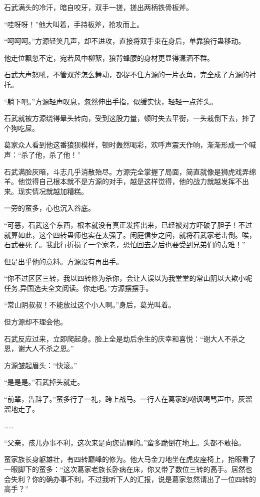 \begin{this_body}
石武满头的冷汗，暗自咬牙，双手一搓，搓出两柄铁骨板斧。

“哇呀呀！”他大叫着，手持板斧，抢攻而上。

“呵呵呵。”方源轻笑几声，却不进攻，直接将双手束在身后，单靠狼行蛊移动。

他走位飘忽不定，宛若风中柳絮，狼背蜂腰的身材更显得潇洒不群。

石武大声怒吼，不管双斧怎么舞动，都捉不住方源的一片衣角，完全成了方源的衬托。

“躺下吧。”方源轻声叹息，忽然伸出手指，似缓实快，轻轻一点斧头。

石武就被方源绕得晕头转向，受到这股力量，顿时失去平衡，一头栽倒下去，摔了个狗吃屎。

葛家众人看到他这番狼狈模样，顿时轰然喝彩，欢呼声震天作响，渐渐形成一个喊声：“杀了他，杀了他！”

石武满脸灰暗，斗志几乎消散殆尽。方源完全掌握了局面，简直就像是狮虎戏弄绵羊。他觉得自己根本就不是方源的对手，越是这样觉得，他的战力就越发挥不出来。现实情况就越加糟糕。

一旁的蛮多，心也沉入谷底。

“可恶，石武这个东西，根本就没有真正发挥出来，已经被对方吓破了胆子！不过就算如此，这个四转蛊师也实在太强了。闲庭信步之间，就将石武家老击倒。唉，石武要死了。我此行折损了一个家老，恐怕回去之后也要受到兄弟们的责难！”

但是出乎他的意料。方源没有再出手。

“你不过区区三转，我以四转修为杀你，会让人误以为我堂堂的常山阴以大欺小呢任务,异国选夫全文阅读。你走吧。”方源摆摆手。

“常山阴叔叔！不能放过这个小人啊。”身后，葛光叫着。

但方源却不理会他。

石武反应过来，立即爬起身。脸上全是劫后余生的庆幸和喜悦：“谢大人不杀之恩，谢大人不杀之恩。”

方源皱起眉头：“快滚。”

“是是是。”石武掉头就走。

“前辈，告辞了。”蛮多行了一礼，跨上战马。一行人在葛家的嘲讽喝骂声中，灰溜溜地走了。

……

“父亲，孩儿办事不利，这次来是向您请罪的。”蛮多跪倒在地上。头都不敢抬。

蛮家族长身躯雄壮，有四转巅峰的修为。他大马金刀地坐在虎皮座椅上，抬眼看了一眼脚下的蛮多：“这次葛家老族长卧病在床，你又带了数位三转的高手。居然也会失利？你的确办事不利，不过我听下人的汇报，说是葛家忽然请出了一位四转的高手？”


\end{this_body}
